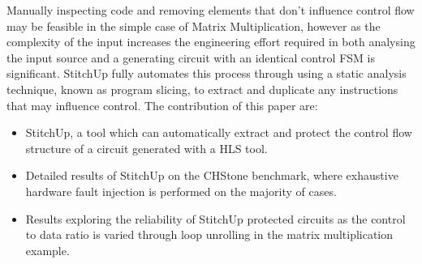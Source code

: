 Manually inspecting code and removing elements that don't influence control flow
may be feasible in the simple case of Matrix Multiplication, however as the complexity of the input increases
the engineering effort required in both analysing the input source and a generating circuit with an identical control FSM is
significant.
StitchUp fully automates this process through using a static analysis technique, known as program slicing, to extract
and duplicate any instructions that may influence control. The contribution of this paper are:
\vspace{-4pt}
\begin{itemize}
	\setlength{\itemsep}{1pt}
	\setlength{\parskip}{0pt}
	\setlength{\parsep}{0pt}
	\item StitchUp, a tool which can automatically extract and protect the control flow structure of a circuit generated with a HLS tool.
	\item Detailed results of StitchUp on the CHStone benchmark, where exhaustive hardware fault injection is performed on the majority of cases.
	\item Results exploring the reliability of StitchUp protected circuits as the control to data ratio is varied through
	loop unrolling in the matrix multiplication example.
\end{itemize}


